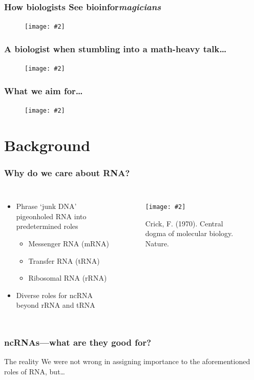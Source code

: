 \documentclass{beamer}
\newcommand{\slidefigure}[2][1]{\texttt{[image: \#2]}}
\begin{document}
\begin{frame}
  \frametitle{How biologists See bioinfor{\em magicians}}
  \begin{figure}
  \centering
  \slidefigure{nemo}
  \end{figure}
\end{frame}

\begin{frame}
  \frametitle{A biologist when stumbling into a math-heavy talk\dots}
  \begin{figure}
  \centering
  \slidefigure{nemofocus}
  \end{figure}
\end{frame}

\begin{frame}
  \frametitle{What we aim for\dots}
  \begin{figure}
  \centering
  \slidefigure{nemoturtle}
  \end{figure}
\end{frame}

\section{Background}

\begin{frame}
  \frametitle{Why do we care about RNA?}
  \begin{columns}
  \begin{itemize}
  \item<1-> Phrase `junk DNA' pigeonholed RNA into predetermined roles
  \begin{itemize}
  \item<2-> Messenger RNA (mRNA)
  \item<2-> Transfer RNA (tRNA)
  \item<2-> Ribosomal RNA (rRNA)
  \end{itemize}
  \item<3-> Diverse roles for ncRNA beyond rRNA and tRNA
  \end{itemize}

  \begin{figure}
  \centering
  \slidefigure{crick1970}
  \caption{Crick, F. (1970). Central dogma of molecular biology. Nature.}
  \end{figure}
  \end{columns}
\end{frame}

\begin{frame}
  \frametitle{ncRNAs---what are they good for?}
  \begin{block}{The reality}
  We were not wrong in assigning importance to the aforementioned roles of RNA, but\dots
  \end{block}
\end{frame}
\end{document}
